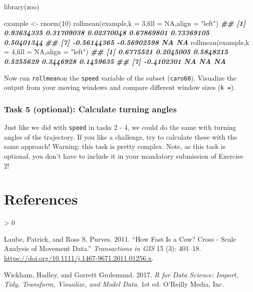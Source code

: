 \documentclass[
]{book}
\newenvironment{Shaded}{\begin{snugshade}}{\end{snugshade}}
\newcommand{\AttributeTok}[1]{\textcolor[rgb]{0.77,0.63,0.00}{#1}}
\newcommand{\ConstantTok}[1]{\textcolor[rgb]{0.00,0.00,0.00}{#1}}
\newcommand{\DecValTok}[1]{\textcolor[rgb]{0.00,0.00,0.81}{#1}}
\newcommand{\DocumentationTok}[1]{\textcolor[rgb]{0.56,0.35,0.01}{\textbf{\textit{#1}}}}
\newcommand{\FunctionTok}[1]{\textcolor[rgb]{0.00,0.00,0.00}{#1}}
\newcommand{\NormalTok}[1]{#1}
\newcommand{\OtherTok}[1]{\textcolor[rgb]{0.56,0.35,0.01}{#1}}
\newcommand{\StringTok}[1]{\textcolor[rgb]{0.31,0.60,0.02}{#1}}
\newlength{\cslhangindent}
\newenvironment{CSLReferences}[2] %
 {%
  \setlength{\parindent}{0pt}
  \ifodd #1 \everypar{\setlength{\hangindent}{\cslhangindent}}\ignorespaces\fi
  \ifnum #2 > 0
  \setlength{\parskip}{#2\baselineskip}
  \fi
 }%
 {}
\begin{document}
\begin{Shaded}
\begin{Highlighting}[]
\FunctionTok{library}\NormalTok{(zoo)}

\NormalTok{example }\OtherTok{\textless{}{-}} \FunctionTok{rnorm}\NormalTok{(}\DecValTok{10}\NormalTok{)}
\FunctionTok{rollmean}\NormalTok{(example,}\AttributeTok{k =} \DecValTok{3}\NormalTok{,}\AttributeTok{fill =} \ConstantTok{NA}\NormalTok{,}\AttributeTok{align =} \StringTok{"left"}\NormalTok{)}
\DocumentationTok{\#\#  [1]  0.93634335  0.31709038  0.02370048  0.67869801  0.73369105  0.50401344}
\DocumentationTok{\#\#  [7] {-}0.56144365 {-}0.56902598          NA          NA}
\FunctionTok{rollmean}\NormalTok{(example,}\AttributeTok{k =} \DecValTok{4}\NormalTok{,}\AttributeTok{fill =} \ConstantTok{NA}\NormalTok{,}\AttributeTok{align =} \StringTok{"left"}\NormalTok{)}
\DocumentationTok{\#\#  [1]  0.6775521  0.2045005  0.5848215  0.5255629  0.3446928  0.1459635}
\DocumentationTok{\#\#  [7] {-}0.4102301         NA         NA         NA}
\end{Highlighting}
\end{Shaded}

Now run \texttt{rollmean}on the \texttt{speed} variable of the subset (\texttt{caro60}). Visualize the output from your moving windows and compare different window sizes (\texttt{k\ =}).

\hypertarget{task-5-optional-calculate-turning-angles}{%
\subsection{Task 5 (optional): Calculate turning angles}\label{task-5-optional-calculate-turning-angles}}

Just like we did with \texttt{speed} in tasks 2 - 4, we could do the same with turning angles of the trajectory. If you like a challenge, try to calculate these with the same approach! Warning: this task is pretty complex. Note, as this task is optional, you don't have to include it in your mandatory submission of Exercise 2!

\hypertarget{references}{%
\chapter*{References}\label{references}}

\hypertarget{refs}{}
\begin{CSLReferences}{1}{0}
\leavevmode\hypertarget{ref-laube2011}{}%
Laube, Patrick, and Ross S. Purves. 2011. {``How Fast Is a Cow? Cross - Scale Analysis of Movement Data.''} \emph{Transactions in GIS} 15 (3): 401--18. \url{https://doi.org/10.1111/j.1467-9671.2011.01256.x}.

\leavevmode\hypertarget{ref-wickham2017}{}%
Wickham, Hadley, and Garrett Grolemund. 2017. \emph{R for Data Science: Import, Tidy, Transform, Visualize, and Model Data}. 1st ed. O'Reilly Media, Inc.

\end{CSLReferences}
\end{document}
